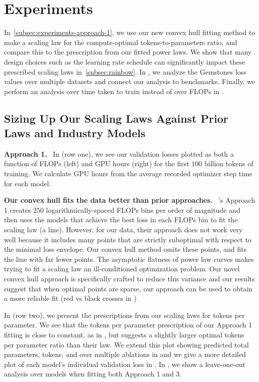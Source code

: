 \documentclass{article}
\begin{document}
\section{Experiments}\label{sec:experiments}

In~\cref{subsec:experiments-approach-1}, we use our new convex hull fitting method to make a scaling law for the compute-optimal tokens-to-parameters ratio, and compare this to the prescription from our fitted power laws.
We show that many design choices such as the learning rate schedule can significantly impact these prescribed scaling laws in~\cref{subsec:rainbow}. 
In , we analyze the Gemstones loss values over multiple datasets and connect our analysis to benchmarks.
Finally, we perform an analysis over time taken to train instead of over FLOPs in .

\subsection{Sizing Up Our Scaling Laws Against Prior Laws and Industry Models}
\noindent \textbf{Approach 1.}~\label{subsec:experiments-approach-1}
In  (row one), we see our validation losses plotted as both a function of FLOPs (left) and GPU hours (right) for the first \(100\) billion tokens of training.
We calculate GPU hours from the average recorded optimizer step time for each model.

\textbf{Our convex hull fits the data better than prior approaches.}
~\citet{hoffmann2022empirical}'s Approach 1 creates \(250\) logarithmically-spaced FLOPs bins per order of magnitude and then uses the models that achieve the best loss in each FLOPs bin to fit the scaling law (a line). However, for our data, their approach does not work very well because it includes many points that are strictly suboptimal with respect to the minimal loss envelope. Our convex hull method omits these points, and fits the line with far fewer points.
The asymptotic flatness of power law curves makes trying to fit a scaling law an ill-conditioned optimization problem. 
Our novel convex hull approach is specifically crafted to reduce this variance and our results suggest that when optimal points are sparse, our approach can be used to obtain a more reliable fit (red vs black crosses in )

In  (row two), we present the prescriptions from our scaling laws for tokens per parameter.
We see that the tokens per parameter prescription of our Approach 1 fitting is close to constant, as in \citet{hoffmann2022empirical}, but suggests a slightly larger optimal tokens per parameter ratio than their law.
We extend this plot showing predicted total parameters, tokens, and over multiple ablations in  and we give a more detailed plot of each model's individual validation loss in .
In , we show a leave-one-out analysis over models when fitting both Approach 1 and 3.
\end{document}
